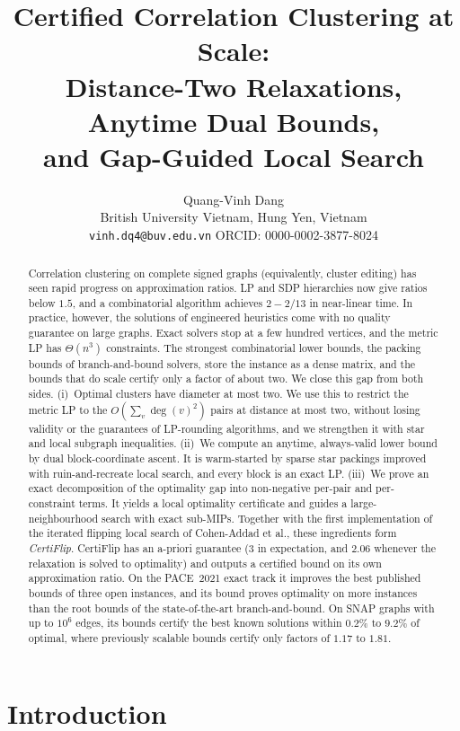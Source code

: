 \documentclass[11pt]{article}
\title{Certified Correlation Clustering at Scale:\\
Distance-Two Relaxations, Anytime Dual Bounds,\\ and Gap-Guided Local Search}
\author{Quang-Vinh Dang\\
British University Vietnam, Hung Yen, Vietnam\\
\texttt{vinh.dq4@buv.edu.vn} \quad ORCID: 0000-0002-3877-8024}
\date{}
\theoremstyle{definition}
\begin{document}
\maketitle

\begin{abstract}
Correlation clustering on complete signed graphs (equivalently, cluster
editing) has seen rapid progress on approximation ratios.  LP and SDP
hierarchies now give ratios below $1.5$, and a combinatorial algorithm
achieves $2-2/13$ in near-linear time.  In practice, however, the solutions of
engineered heuristics come with no quality guarantee on large graphs.  Exact
solvers stop at a few hundred vertices, and the metric LP has $\Theta(n^3)$
constraints.  The strongest combinatorial lower bounds, the packing bounds of
branch-and-bound solvers, store the instance as a dense matrix, and the
bounds that do scale certify only a factor of about two.  We close this gap
from both sides.
(i)~Optimal clusters have diameter at most two.  We use this to restrict the
metric LP to the $O(\sum_v \deg(v)^2)$ pairs at distance at most two, without
losing validity or the guarantees of LP-rounding algorithms, and we
strengthen it with star and local subgraph inequalities.
(ii)~We compute an anytime, always-valid lower bound by dual
block-coordinate ascent.  It is warm-started by sparse star packings improved
with ruin-and-recreate local search, and every block is an exact LP.
(iii)~We prove an exact decomposition of the optimality gap into non-negative
per-pair and per-constraint terms.  It yields a local optimality certificate
and guides a large-neighbourhood search with exact sub-MIPs.
Together with the first implementation of the iterated flipping local search
of Cohen-Addad et al., these ingredients form \emph{CertiFlip}.  CertiFlip
has an a-priori guarantee ($3$ in expectation, and $2.06$ whenever the
relaxation is solved to optimality) and outputs a certified bound on its own
approximation ratio.  On the PACE~2021 exact track it improves the best published
bounds of three open instances, and its bound proves optimality on more
instances than the root bounds of the state-of-the-art branch-and-bound.  On SNAP graphs with up to $10^6$
edges, its bounds certify the best known solutions within $0.2\%$ to $9.2\%$
of optimal, where previously scalable bounds certify only factors of $1.17$ to
$1.81$.
\end{abstract}

\section{Introduction}
\end{document}
